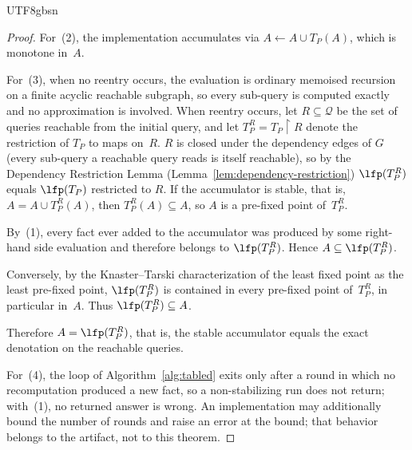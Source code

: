 \begin{CJK*}{UTF8}{gbsn}
\begin{proof}
  For~(2), the implementation accumulates via
  $A \leftarrow A \cup T_P(A)$, which is monotone in~$A$.

  For~(3), when no reentry occurs, the evaluation is
  ordinary memoised recursion on a finite acyclic
  reachable subgraph, so every sub-query is computed
  exactly and no approximation is involved.
  When reentry occurs, let $R \subseteq \mathcal{Q}$ be
  the set of queries reachable from the initial query,
  and let $T_P^R = T_P{\restriction}R$ denote the
  restriction of $T_P$ to maps on~$R$.
  $R$ is closed under the dependency edges of $G$
  (every sub-query a reachable query reads is itself
  reachable), so by the Dependency Restriction Lemma
  (Lemma~\ref{lem:dependency-restriction}) $\lfp(T_P^R)$
  equals $\lfp(T_P)$ restricted to $R$.
  If the accumulator is stable, that is,
  $A = A \cup T_P^R(A)$, then
  $T_P^R(A) \subseteq A$, so $A$ is a pre-fixed point
  of~$T_P^R$.

  By~(1), every fact ever added to the accumulator was
  produced by some right-hand side evaluation and
  therefore belongs to $\lfp(T_P^R)$.
  Hence $A \subseteq \lfp(T_P^R)$.

  Conversely, by the Knaster--Tarski characterization
  of the least fixed point as the least pre-fixed
  point, $\lfp(T_P^R)$ is contained in every
  pre-fixed point of~$T_P^R$, in particular in~$A$.
  Thus $\lfp(T_P^R) \subseteq A$.

  Therefore $A = \lfp(T_P^R)$, that is, the stable
  accumulator equals the exact denotation on the
  reachable queries.

  For~(4), the loop of Algorithm~\ref{alg:tabled} exits only after a
  round in which no recomputation produced a new fact, so a
  non-stabilizing run does not return; with~(1), no returned answer
  is wrong. An implementation may additionally bound the number of
  rounds and raise an error at the bound; that behavior belongs to
  the artifact, not to this theorem.
\fi
\end{proof}


\end{CJK*}
